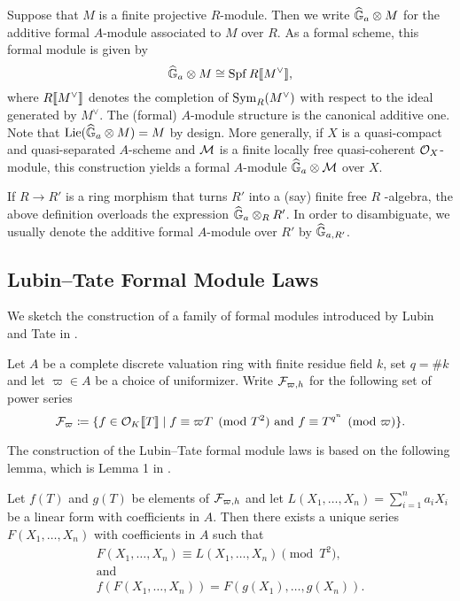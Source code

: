 \documentclass[../main.tex]{subfiles}
\begin{document}
\begin{defi}
  \label{def:additiveformalmoduleassociatedtomodule}
  Suppose that $M$ is a finite projective $R$-module. Then we write
  $\widehat{\mathbb{G}}_a \otimes M$ for the additive formal $A$-module associated to $M$ over $R$.
  As a formal scheme, this formal module is given by
  \begin{equation*}
    \widehat{\mathbb{G}}_a \otimes M \cong \operatorname{Spf} R \llbracket M^\vee \rrbracket,
  \end{equation*}
  where $R \llbracket M^\vee \rrbracket$ denotes the completion of $\operatorname{Sym}_R(M^\vee)$ with respect
  to the ideal generated by $M^\vee$. The (formal) $A$-module structure is the
  canonical additive one. 
  Note that $\operatorname{Lie}(\widehat{\mathbb{G}}_a \otimes M) = M$ by design. 
  More generally, if $X$ is a quasi-compact and quasi-separated $A$-scheme
  and $\mathcal{M}$ is a finite locally free quasi-coherent 
  $\mathcal{O}_X$-module, this construction yields a formal $A$-module
  $\widehat{\mathbb{G}}_a \otimes \mathcal{M}$ over $X$.
\end{defi}
\begin{rmk} 
  If $R\to R'$ is a ring morphism that turns $R'$ into a (say) finite free
$R$ -algebra, the above definition overloads the expression $\widehat{\mathbb{G}}_a \otimes_R R'$.
  In order to disambiguate, we usually denote the additive formal $A$-module
  over $R'$ by $\widehat{\mathbb{G}}_{a, R'}$. 
\end{rmk}


\subsection{Lubin--Tate Formal Module Laws} %
\label{sub:Lubin--Tate Formal Module Laws}
We sketch the construction of a family of formal modules introduced by 
Lubin and Tate in \cite{LubinTateFormalMult}.

Let $A$ be a complete discrete valuation ring with 
finite residue field $k$, set $q = \# k$ and let $\varpi \in A$ be a choice of
uniformizer.
Write $\mathcal{F}_{\varpi, h}$ for the following set of power series
\begin{equation*}
  \mathcal{F}_\varpi \coloneqq \{f \in \mathcal{O}_K \llbracket T \rrbracket \mid f \equiv \varpi T \pmod {T^2}
  \text{ and } f \equiv T^{q^n} \pmod \varpi\}. 
\end{equation*}

The construction of the Lubin--Tate formal module laws is based on the following 
lemma, which is Lemma 1 in \cite{LubinTateFormalMult}.
\begin{lem}\label{lem:LTLemma1}
  Let $f(T)$ and $g(T)$ be elements of $\mathcal{F}_{\varpi,h}$ and let 
  $L(X_1, \dots, X_n) = \sum_{i=1}^n a_i X_i$ be a linear form with coefficients in 
  $A$. Then there exists a unique series $F(X_1, \dots, X_n)$ with coefficients 
  in $A$ such that 
  \begin{gather*}
    F(X_1, \dots, X_n) \equiv L(X_1, \dots, X_n) \pmod {T^2}, \\ \text{and} \\
    f(F(X_1, \dots, X_n)) = F(g(X_1), \dots, g(X_n)).
  \end{gather*}
\end{lem}
\end{document}
